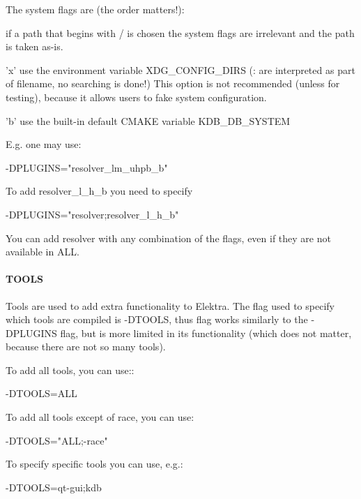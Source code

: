 The system flags are (the order matters!)\+:


\begin{DoxyItemize}
\item if a path that begins with / is chosen the system flags are irrelevant and the path is taken as-\/is.
\item 'x' use the environment variable X\+D\+G\+\_\+\+C\+O\+N\+F\+I\+G\+\_\+\+D\+I\+R\+S (\+: are interpreted as part of filename, no searching is done!) This option is not recommended (unless for testing), because it allows users to fake system configuration.
\item 'b' use the built-\/in default C\+M\+A\+K\+E variable K\+D\+B\+\_\+\+D\+B\+\_\+\+S\+Y\+S\+T\+E\+M
\end{DoxyItemize}

E.\+g. one may use\+: \begin{DoxyVerb}    -DPLUGINS="resolver_lm_uhpb_b"
\end{DoxyVerb}


To add resolver\+\_\+l\+\_\+h\+\_\+b you need to specify \begin{DoxyVerb}    -DPLUGINS="resolver;resolver_l_h_b"
\end{DoxyVerb}


You can add resolver with any combination of the flags, even if they are not available in {\ttfamily A\+L\+L}.

\paragraph*{T\+O\+O\+L\+S}

Tools are used to add extra functionality to Elektra. The flag used to specify which tools are compiled is {\ttfamily -\/\+D\+T\+O\+O\+L\+S}, thus flag works similarly to the {\ttfamily -\/\+D\+P\+L\+U\+G\+I\+N\+S} flag, but is more limited in its functionality (which does not matter, because there are not so many tools).

To add all tools, you can use\+:\+: \begin{DoxyVerb}    -DTOOLS=ALL
\end{DoxyVerb}


To add all tools except of race, you can use\+: \begin{DoxyVerb}    -DTOOLS="ALL;-race"
\end{DoxyVerb}


To specify specific tools you can use, e.\+g.\+: \begin{DoxyVerb}    -DTOOLS=qt-gui;kdb
\end{DoxyVerb}


